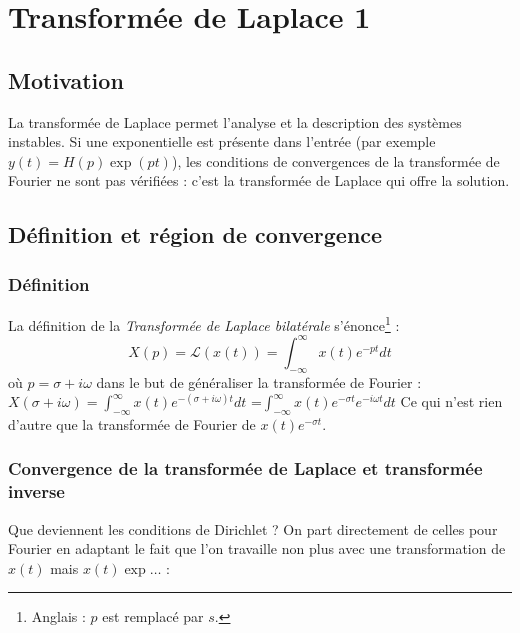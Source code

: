 \chapter{Transformée de Laplace 1}
\section{Motivation}
La transformée de Laplace permet l'analyse et la description des systèmes instables.
Si une exponentielle est présente dans l'entrée (par exemple $y(t) = H(p)\exp(pt)$), les
conditions de convergences de la transformée de Fourier ne sont pas vérifiées : c'est
la transformée de Laplace qui offre la solution.


\section{Définition et région de convergence}
	\subsection{Définition}
	La définition de la \textit{Transformée de Laplace bilatérale} s'énonce\footnote{
	Anglais : $p$ est remplacé par $s$.} :
	\begin{equation}
	X(p) = \mathcal{L}(x(t)) = \int_{-\infty}^\infty x(t)e^{-pt}dt
	\end{equation}
	où $p= \sigma + i\omega$ dans le but de généraliser la transformée de Fourier :
$	X(\sigma+i\omega) = \int_{-\infty}^\infty x(t)e^{-(\sigma+i\omega)t}dt$ =$ 
	\int_{-\infty}^\infty x(t)e^{-\sigma t}e^{-i\omega t}dt
$%
	Ce qui n'est rien d'autre que la transformée de Fourier de $x(t)e^{-\sigma t}$.


	\subsection{Convergence de la transformée de Laplace et transformée inverse}
	Que deviennent les conditions de Dirichlet ? On part directement de celles pour
	Fourier en adaptant le fait que l'on travaille non plus avec une transformation 
	de $x(t)$ mais $x(t)\exp\dots$ :
	
